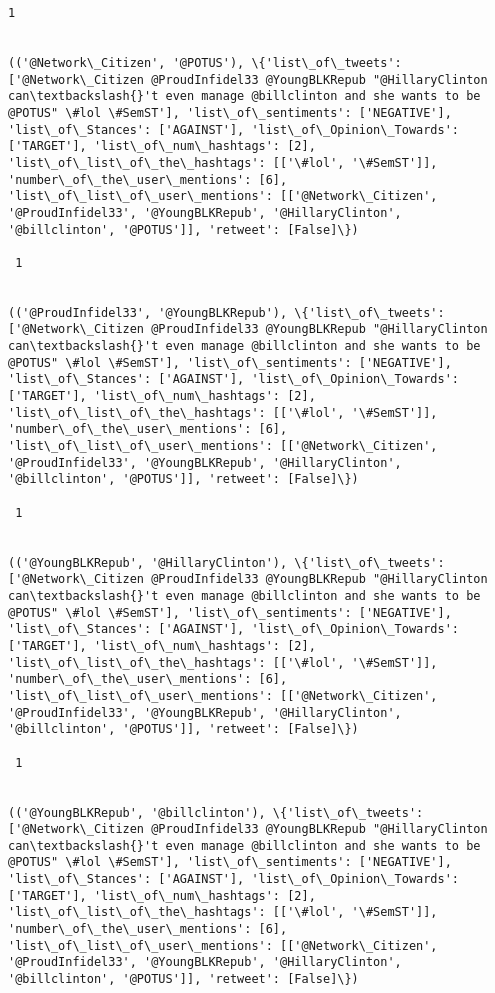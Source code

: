 \documentclass[11pt]{article}
\begin{document}
\begin{Verbatim}[commandchars=\\\{\}]
 1
 

(('@Network\_Citizen', '@POTUS'), \{'list\_of\_tweets': ['@Network\_Citizen @ProudInfidel33 @YoungBLKRepub "@HillaryClinton can\textbackslash{}'t even manage @billclinton and she wants to be @POTUS" \#lol \#SemST'], 'list\_of\_sentiments': ['NEGATIVE'], 'list\_of\_Stances': ['AGAINST'], 'list\_of\_Opinion\_Towards': ['TARGET'], 'list\_of\_num\_hashtags': [2], 'list\_of\_list\_of\_the\_hashtags': [['\#lol', '\#SemST']], 'number\_of\_the\_user\_mentions': [6], 'list\_of\_list\_of\_user\_mentions': [['@Network\_Citizen', '@ProudInfidel33', '@YoungBLKRepub', '@HillaryClinton', '@billclinton', '@POTUS']], 'retweet': [False]\})

 1
 

(('@ProudInfidel33', '@YoungBLKRepub'), \{'list\_of\_tweets': ['@Network\_Citizen @ProudInfidel33 @YoungBLKRepub "@HillaryClinton can\textbackslash{}'t even manage @billclinton and she wants to be @POTUS" \#lol \#SemST'], 'list\_of\_sentiments': ['NEGATIVE'], 'list\_of\_Stances': ['AGAINST'], 'list\_of\_Opinion\_Towards': ['TARGET'], 'list\_of\_num\_hashtags': [2], 'list\_of\_list\_of\_the\_hashtags': [['\#lol', '\#SemST']], 'number\_of\_the\_user\_mentions': [6], 'list\_of\_list\_of\_user\_mentions': [['@Network\_Citizen', '@ProudInfidel33', '@YoungBLKRepub', '@HillaryClinton', '@billclinton', '@POTUS']], 'retweet': [False]\})

 1
 

(('@YoungBLKRepub', '@HillaryClinton'), \{'list\_of\_tweets': ['@Network\_Citizen @ProudInfidel33 @YoungBLKRepub "@HillaryClinton can\textbackslash{}'t even manage @billclinton and she wants to be @POTUS" \#lol \#SemST'], 'list\_of\_sentiments': ['NEGATIVE'], 'list\_of\_Stances': ['AGAINST'], 'list\_of\_Opinion\_Towards': ['TARGET'], 'list\_of\_num\_hashtags': [2], 'list\_of\_list\_of\_the\_hashtags': [['\#lol', '\#SemST']], 'number\_of\_the\_user\_mentions': [6], 'list\_of\_list\_of\_user\_mentions': [['@Network\_Citizen', '@ProudInfidel33', '@YoungBLKRepub', '@HillaryClinton', '@billclinton', '@POTUS']], 'retweet': [False]\})

 1
 

(('@YoungBLKRepub', '@billclinton'), \{'list\_of\_tweets': ['@Network\_Citizen @ProudInfidel33 @YoungBLKRepub "@HillaryClinton can\textbackslash{}'t even manage @billclinton and she wants to be @POTUS" \#lol \#SemST'], 'list\_of\_sentiments': ['NEGATIVE'], 'list\_of\_Stances': ['AGAINST'], 'list\_of\_Opinion\_Towards': ['TARGET'], 'list\_of\_num\_hashtags': [2], 'list\_of\_list\_of\_the\_hashtags': [['\#lol', '\#SemST']], 'number\_of\_the\_user\_mentions': [6], 'list\_of\_list\_of\_user\_mentions': [['@Network\_Citizen', '@ProudInfidel33', '@YoungBLKRepub', '@HillaryClinton', '@billclinton', '@POTUS']], 'retweet': [False]\})


\end{Verbatim}
\end{document}

